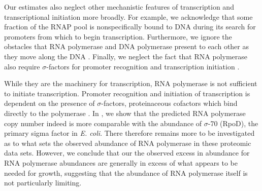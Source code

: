 Our estimates also neglect other mechanistic features of transcription and
transcriptional initiation more broadly. For example, we acknowledge that some
fraction of the RNAP pool is nonspecifically bound to DNA during its search for
promoters from which to begin transcription. Furthermore, we ignore the
obstacles that RNA polymerase and DNA polymerase present to each other as they
move along the DNA \citep{finkelstein2013}. Finally, we neglect the fact that
RNA polymerase also require $\sigma$-factors for promoter recognition and
transcription initiation \citep{browning2016}.

While they are the machinery for transcription, RNA polymerase is not
sufficient to initiate transcription. Promoter recognition and initiation of
transcription is dependent on the presence of $\sigma$-factors, proteinaceous
cofactors which bind directly to the polymerase \citep{browning2016}. In
, we show that the predicted RNA polymerase
copy number indeed is more comparable with the abundance of $\sigma$-70
(RpoD), the primary sigma factor in \textit{E. coli}. There therefore remains
more to be investigated as to what sets the observed abundance of RNA
polymerase in these proteomic data sets. However, we conclude that our
the observed excess in abundance for RNA polymerase
abundances are generally in excess of what appears to be needed for growth, suggesting
that the abundance of RNA polymerase itself is not particularly limiting.


